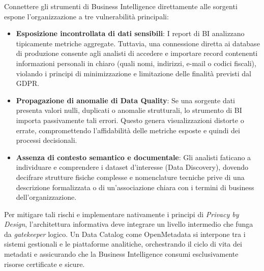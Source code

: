Connettere gli strumenti di Business Intelligence direttamente alle sorgenti espone l'organizzazione a tre vulnerabilità principali:
\begin{itemize}
    \item \textbf{Esposizione incontrollata di dati sensibili}: I report di BI analizzano tipicamente metriche aggregate. Tuttavia, una connessione diretta ai database di produzione consente agli analisti di accedere e importare record contenenti informazioni personali in chiaro (quali nomi, indirizzi, e-mail o codici fiscali), violando i principi di minimizzazione e limitazione delle finalità previsti dal GDPR.
    \item \textbf{Propagazione di anomalie di Data Quality}: Se una sorgente dati presenta valori nulli, duplicati o anomalie strutturali, lo strumento di BI importa passivamente tali errori. Questo genera visualizzazioni distorte o errate, compromettendo l'affidabilità delle metriche esposte e quindi dei processi decisionali.
    \item \textbf{Assenza di contesto semantico e documentale}: Gli analisti faticano a individuare e comprendere i dataset d'interesse (Data Discovery), dovendo decifrare strutture fisiche complesse e nomenclature tecniche prive di una descrizione formalizzata o di un'associazione chiara con i termini di business dell'organizzazione.
\end{itemize}

\noindent Per mitigare tali rischi e implementare nativamente i principi di \emph{Privacy by Design}, l'architettura informativa deve integrare un livello intermedio che funga 
da \emph{gatekeeper} logico. Un Data Catalog come OpenMetadata si interpone tra i sistemi gestionali e le piattaforme analitiche, orchestrando il ciclo di 
vita dei metadati e assicurando che la Business Intelligence consumi esclusivamente risorse certificate e sicure.


